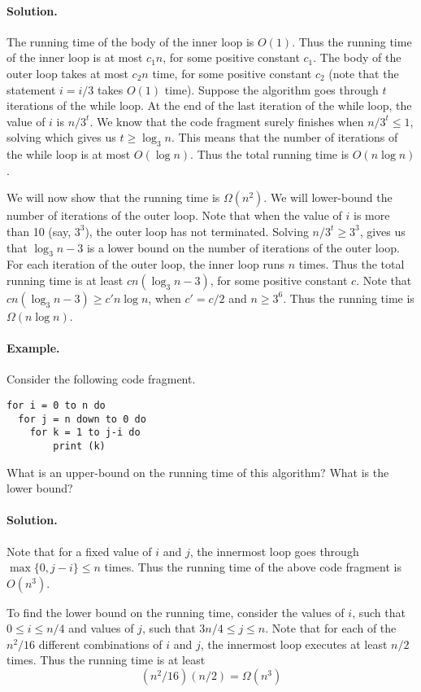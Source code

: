 \documentclass[11pt,twoside]{article}
\begin{document}
\paragraph{Solution.}
The running time of the body of the inner loop is $O(1)$. Thus the
running time of the inner loop is at most $c_1n$, for some positive constant
$c_1$. The body of the outer loop takes at most $c_2n$ time, for some
positive constant $c_2$ (note that the statement $i=i/3$ takes $O(1)$
time). Suppose the algorithm goes through $t$ iterations of the while
loop. At the end of the last iteration of the while loop, the value of $i$ is
$n/3^t$. We know that the code fragment surely finishes when
$n/3^{t}\leq 1$, solving which gives us $t\geq \log_3 n$. This means
that the number of iterations of the while loop is at most $O(\log
n)$. Thus the total running time is $O(n\log n)$.

We will now show that the running time is $\Omega(n^2)$. We will
lower-bound the number of iterations of the outer loop. Note that when
the value of $i$ is more than 10 (say, $3^3$), the outer loop has not
terminated. Solving $n/3^t\geq 3^3$, gives us that $\log_3n-3$ is a lower
bound on the number of iterations of the outer loop. For each
iteration of the outer loop, the inner loop runs $n$ times. Thus the
total running time is at least $cn(\log_3n-3)$, for some positive 
constant $c$. Note that $cn(\log_3 n-3)\geq c'n\log n$, when $c'=c/2$
and $n\geq 3^6$. Thus the running time is $\Omega(n\log n)$.

\paragraph{Example.} Consider the following code fragment.
\begin{verbatim}
for i = 0 to n do
  for j = n down to 0 do
    for k = 1 to j-i do
        print (k)
\end{verbatim}
What is an upper-bound on the running time of this algorithm? What is
the lower bound?
\paragraph{Solution.}
Note that for a fixed value of $i$ and $j$, the innermost loop goes
through $\max\{0,j-i\}\leq n$ times. Thus the running time of the
above code fragment is $O(n^3)$.

To find the lower bound on the running time, consider the values of
$i$, such that $0\leq i \leq n/4$ and values of $j$, such that $3n/4 \leq j
\leq n$. Note that for each of the $n^2/16$ different
combinations of $i$ and $j$, the innermost loop executes at least
$n/2$ times. Thus the running time is at least 
\[
(n^2/16)(n/2) = \Omega(n^3)
\]
\end{document}
